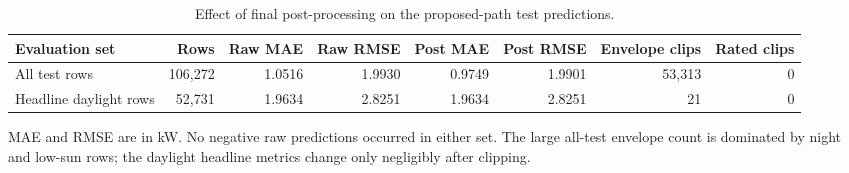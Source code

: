 \begin{table}[!t]
\caption{Effect of final post-processing on the proposed-path test predictions.}
\label{tab:postprocess_audit}
\centering
\scriptsize
\setlength{\tabcolsep}{4pt}
\begin{tabular}{@{}lrrrrrrr@{}}
\toprule
Evaluation set & Rows & Raw MAE & Raw RMSE & Post MAE & Post RMSE & Envelope clips & Rated clips \\
\midrule
All test rows & 106,272 & 1.0516 & 1.9930 & 0.9749 & 1.9901 & 53,313 & 0 \\
Headline daylight rows & 52,731 & 1.9634 & 2.8251 & 1.9634 & 2.8251 & 21 & 0 \\
\bottomrule
\end{tabular}
\vspace{2pt}
\raggedright\footnotesize{MAE and RMSE are in kW. No negative raw predictions occurred in either set. The large all-test envelope count is dominated by night and low-sun rows; the daylight headline metrics change only negligibly after clipping.}
\end{table}

